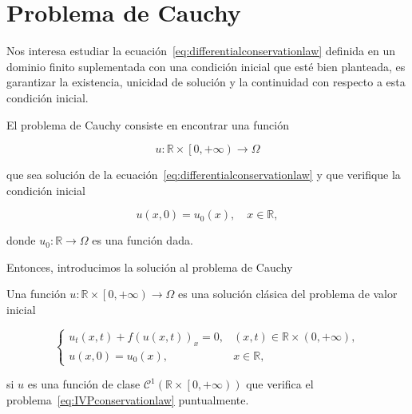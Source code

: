 \section{Problema de Cauchy}

Nos interesa estudiar la
ecuación~\eqref{eq:differentialconservationlaw} definida en un
dominio finito suplementada con una condición inicial que esté bien
planteada, es garantizar la existencia, unicidad de solución y la
continuidad con respecto a esta condición inicial.

\begin{definition}
  El problema de Cauchy consiste en encontrar una función

  \begin{equation*}
    u\colon\mathbb{R}\times
    \left[0,+\infty\right)\longrightarrow
    \Omega
  \end{equation*}

  que sea solución de la
  ecuación~\eqref{eq:differentialconservationlaw} y que verifique la
  condición inicial

  \begin{equation*}
    u\left(x,0\right)=
    u_{0}\left(x\right),\quad
    x\in\mathbb{R},
  \end{equation*}

  donde
  \begin{math}
    u_{0}\colon\mathbb{R}\to\Omega
  \end{math}
  es una función dada.
\end{definition}

Entonces, introducimos la solución al problema de Cauchy

\begin{definition}
  Una función
  \begin{math}
    u\colon\mathbb{R}\times
    \left[0,+\infty\right)\to
    \Omega
  \end{math}
  es una solución clásica del problema de valor inicial

  \begin{equation}\label{eq:IVPconservationlaw}
    \begin{cases}
      u_{t}
      \left(x,t\right)+
      {f\left(u\left(x,t\right)\right)}_{x}=
      0,              &
      \left(x,t\right)\in
      \mathbb{R}\times
      \left(0,+\infty\right), \\
      u\left(x,0\right)=
      u_{0}
      \left(x\right), &
      x\in\mathbb{R},
    \end{cases}
  \end{equation}

  si $u$ es una función de clase
  \begin{math}
    \mathcal{C}^{1}
    \left(
    \mathbb{R}\times
    \left[0,+\infty\right)
    \right)
  \end{math}
  que verifica el problema~\eqref{eq:IVPconservationlaw}
  puntualmente.
\end{definition}

